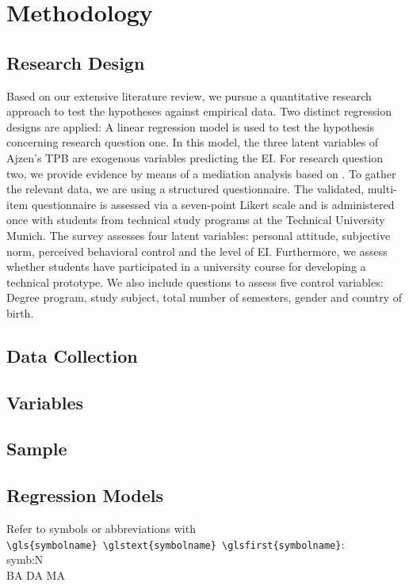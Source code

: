 \chapter{Methodology}\label{chapter:Methodology}
\section{Research Design}
Based on our extensive literature review, we pursue a quantitative research approach to test the hypotheses against empirical data. Two distinct regression designs are applied: A linear regression model is used to test the hypothesis concerning research question one. In this model, the three latent variables of Ajzen's TPB are exogenous variables predicting the EI. For research question two, we provide evidence by means of a mediation analysis based on \cite{baron1986moderator}.
To gather the relevant data, we are using a structured questionnaire. The validated, multi-item questionnaire is assessed via a seven-point Likert scale and is administered once with students from technical study programs at the Technical University Munich. The survey assesses four latent variables: personal attitude, subjective norm, perceived behavioral control and the level of EI.  Furthermore, we assess whether students have participated in a university course for developing a technical prototype. We also include questions to assess five control variables: Degree program, study subject, total number of semesters, gender and country of birth.

\section{Data Collection}
\section{Variables}
\section{Sample}
\section{Regression Models}

Refer to symbols or abbreviations with\\\verb+\gls{symbolname} \glstext{symbolname} \glsfirst{symbolname}+:\\
\gls{symb:N}  \\
\gls{BA} \gls{DA} \gls{MA}


